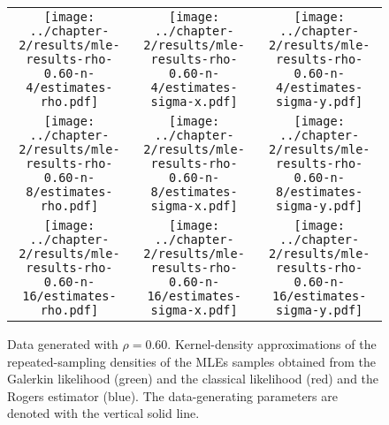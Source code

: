 \begin{figure}
  \centering
  \begin{tabular}{ccc}
    \begin{minipage}{0.3\textwidth}
      \centering
      \texttt{[image: ../chapter-2/results/mle-results-rho-0.60-n-4/estimates-rho.pdf]}
    \end{minipage}
    & \begin{minipage}{0.3\textwidth}
      \centering
      \texttt{[image: ../chapter-2/results/mle-results-rho-0.60-n-4/estimates-sigma-x.pdf]}
    \end{minipage}
    & \begin{minipage}{0.3\textwidth}
      \centering
      \texttt{[image: ../chapter-2/results/mle-results-rho-0.60-n-4/estimates-sigma-y.pdf]}
    \end{minipage} \\
    \begin{minipage}{0.3\textwidth}
      \centering
      \texttt{[image: ../chapter-2/results/mle-results-rho-0.60-n-8/estimates-rho.pdf]}
    \end{minipage}
    & \begin{minipage}{0.3\textwidth}
      \centering
      \texttt{[image: ../chapter-2/results/mle-results-rho-0.60-n-8/estimates-sigma-x.pdf]}
    \end{minipage}
    & \begin{minipage}{0.3\textwidth}
      \centering
      \texttt{[image: ../chapter-2/results/mle-results-rho-0.60-n-8/estimates-sigma-y.pdf]}
    \end{minipage} \\
    \begin{minipage}{0.3\textwidth}
      \centering
      \texttt{[image: ../chapter-2/results/mle-results-rho-0.60-n-16/estimates-rho.pdf]}
    \end{minipage}
    & \begin{minipage}{0.3\textwidth}
      \centering
      \texttt{[image: ../chapter-2/results/mle-results-rho-0.60-n-16/estimates-sigma-x.pdf]}
    \end{minipage}
    & \begin{minipage}{0.3\textwidth}
      \centering
      \texttt{[image: ../chapter-2/results/mle-results-rho-0.60-n-16/estimates-sigma-y.pdf]}
    \end{minipage}
  \end{tabular}
  \caption{Data generated with $\rho=0.60$. Kernel-density
    approximations of the repeated-sampling densities of the MLEs
    samples obtained from the Galerkin likelihood (green) and the
    classical likelihood (red) and the Rogers estimator
    (blue). The data-generating parameters are denoted with the
    vertical solid line.}
  \label{fig:mle-comparison-rho-0.60}
\end{figure}



